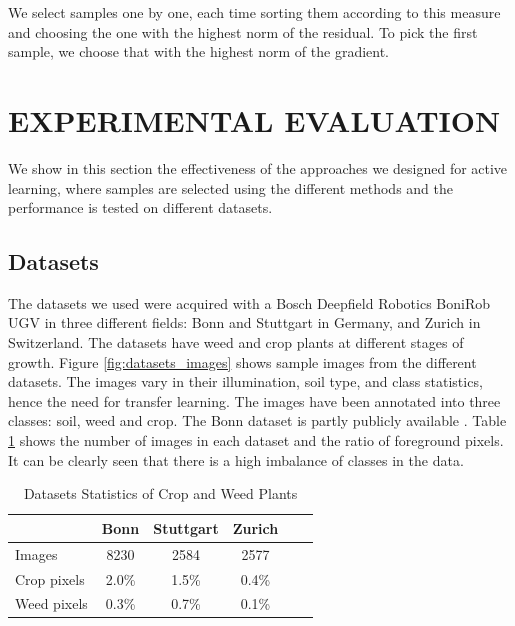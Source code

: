 We select samples one by one, each time sorting them according to this measure and choosing the one with the highest norm of the residual. To pick the first sample, we choose that with the highest norm of the gradient.



\section{EXPERIMENTAL EVALUATION}
\label{sec:exp}


We show in this section the effectiveness of the approaches we designed for active learning, where samples are selected using the different methods and the performance is tested on different datasets. 


\subsection{Datasets}

The datasets we used were acquired with a Bosch Deepfield Robotics BoniRob UGV in three different fields: Bonn and Stuttgart in Germany, and Zurich in Switzerland. The datasets have weed and crop plants at different stages of growth. Figure \ref{fig:datasets_images} shows sample images from the different datasets. The images vary in their illumination, soil type, and class statistics, hence the need for transfer learning. The images have been annotated into three classes: soil, weed and crop. The Bonn dataset is partly publicly available \cite{chebrolu2017agricultural}. Table \ref{tab:datasets_stats} shows the number of images in each dataset and the ratio of foreground pixels. It can be clearly seen that there is a high imbalance of classes in the data.



    \begin{table}
       \vspace{1em}
        \centering
        \caption{Datasets Statistics of Crop and Weed Plants}
        \begin{tabular}{@{}lccccc@{}} 
            \toprule
              & Bonn & Stuttgart & Zurich \\ 
            \midrule 
    		  Images  & 8230 & 2584 & 2577 \\ \addlinespace
    		  Crop pixels & 2.0\% & 1.5\% & 0.4\%  \\ \addlinespace
    		  Weed pixels & 0.3\% & 0.7\% & 0.1\%  \\    
            \bottomrule
        \end{tabular}
        \label{tab:datasets_stats}
    \end{table}
    
